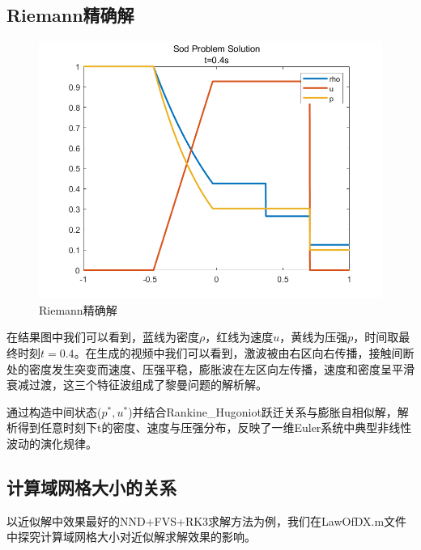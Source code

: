 \documentclass[12pt,a4paper]{article}%
\begin{document}
		\subsection{Riemann精确解}
		\begin{figure}[H]
		\centering
		\begin{minipage}{1\textwidth}
			\centering
			\includegraphics[width=\textwidth]{./fig/Riemann.png}
			\caption{\fontsize{10pt}{15pt}\selectfont Riemann精确解}
		\end{minipage}
		\end{figure}
		在结果图中我们可以看到，蓝线为密度$\rho$，红线为速度$u$，黄线为压强$p$，时间取最终时刻$t=0.4$。在生成的视频中我们可以看到，激波被由右区向右传播，接触间断处的密度发生突变而速度、压强平稳，膨胀波在左区向左传播，速度和密度呈平滑衰减过渡，这三个特征波组成了黎曼问题的解析解。
		
		通过构造中间状态($p^*,u^*$)并结合Rankine\_Hugoniot跃迁关系与膨胀自相似解，解析得到任意时刻下t的密度、速度与压强分布，反映了一维Euler系统中典型非线性波动的演化规律。
		
		\subsection{计算域网格大小的关系}
		以近似解中效果最好的NND+FVS+RK3求解方法为例，我们在LawOfDX.m文件中探究计算域网格大小对近似解求解效果的影响。
		
\end{document}
